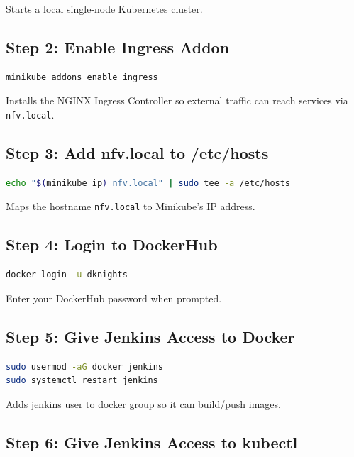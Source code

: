 \documentclass[12pt,a4paper]{article}
\begin{document}
Starts a local single-node Kubernetes cluster.

\subsection{Step 2: Enable Ingress Addon}

\begin{lstlisting}[language=bash]
minikube addons enable ingress
\end{lstlisting}

Installs the NGINX Ingress Controller so external traffic can reach services via \texttt{nfv.local}.

\subsection{Step 3: Add nfv.local to /etc/hosts}

\begin{lstlisting}[language=bash]
echo "$(minikube ip) nfv.local" | sudo tee -a /etc/hosts
\end{lstlisting}

Maps the hostname \texttt{nfv.local} to Minikube's IP address.

\subsection{Step 4: Login to DockerHub}

\begin{lstlisting}[language=bash]
docker login -u dknights
\end{lstlisting}

Enter your DockerHub password when prompted.

\subsection{Step 5: Give Jenkins Access to Docker}

\begin{lstlisting}[language=bash]
sudo usermod -aG docker jenkins
sudo systemctl restart jenkins
\end{lstlisting}

Adds jenkins user to docker group so it can build/push images.

\subsection{Step 6: Give Jenkins Access to kubectl}
\end{document}
